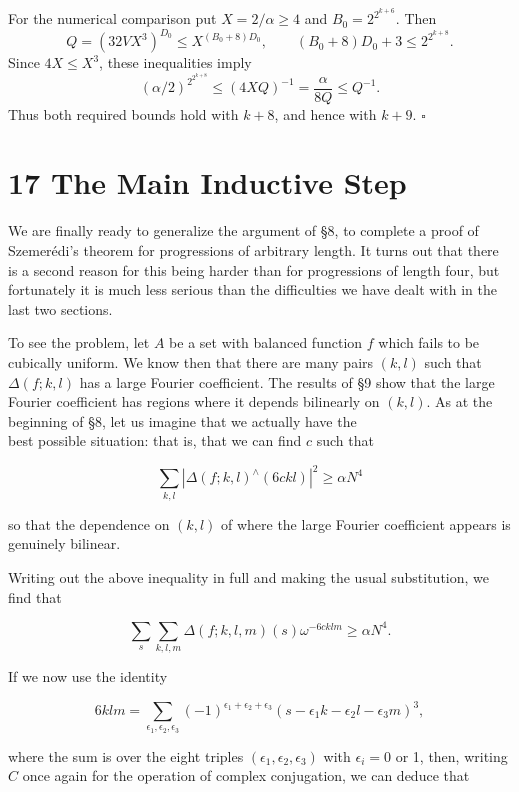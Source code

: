 \documentclass[10pt]{article}
\begin{document}
For the numerical comparison put $X=2/\alpha\geqslant4$ and $B_0=2^{2^{k+6}}$. Then
\[
Q=(32VX^3)^{D_0}\leqslant X^{(B_0+8)D_0},\qquad
(B_0+8)D_0+3\leqslant 2^{2^{k+8}}.
\]
Since $4X\leqslant X^3$, these inequalities imply
\[
(\alpha/2)^{2^{2^{k+8}}}
\leqslant (4XQ)^{-1}=\frac{\alpha}{8Q}\leqslant Q^{-1}.
\]
Thus both required bounds hold with $k+8$, and hence with $k+9$. \(\square\)

\section*{17 The Main Inductive Step}
We are finally ready to generalize the argument of §8, to complete a proof of Szemerédi's theorem for progressions of arbitrary length. It turns out that there is a second reason for this being harder than for progressions of length four, but fortunately it is much less serious than the difficulties we have dealt with in the last two sections.

To see the problem, let $A$ be a set with balanced function $f$ which fails to be cubically uniform. We know then that there are many pairs $(k, l)$ such that $\Delta(f ; k, l)$ has a large Fourier coefficient. The results of §9 show that the large Fourier coefficient has regions where it depends bilinearly on $(k, l)$. As at the beginning of §8, let us imagine that we actually have the\\
best possible situation: that is, that we can find $c$ such that

$$
\sum_{k, l}\left|\Delta(f ; k, l)^{\wedge}(6 c k l)\right|^{2} \geqslant \alpha N^{4}
$$

so that the dependence on $(k, l)$ of where the large Fourier coefficient appears is genuinely bilinear.

Writing out the above inequality in full and making the usual substitution, we find that

$$
\sum_{s} \sum_{k, l, m} \Delta(f ; k, l, m)(s) \omega^{-6 c k l m} \geqslant \alpha N^{4} .
$$

If we now use the identity

$$
6 k l m=\sum_{\epsilon_{1}, \epsilon_{2}, \epsilon_{3}}(-1)^{\epsilon_{1}+\epsilon_{2}+\epsilon_{3}}\left(s-\epsilon_{1} k-\epsilon_{2} l-\epsilon_{3} m\right)^{3},
$$

where the sum is over the eight triples $\left(\epsilon_{1}, \epsilon_{2}, \epsilon_{3}\right)$ with $\epsilon_{i}=0$ or 1, then, writing $C$ once again for the operation of complex conjugation, we can deduce that
\end{document}
